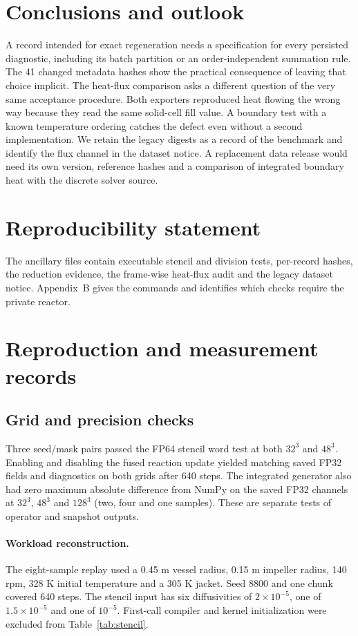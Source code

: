\documentclass{article}
\begin{document}
\section{Conclusions and outlook}
A record intended for exact regeneration needs a specification for every persisted diagnostic, including its batch partition or an order-independent summation rule. The 41 changed metadata hashes show the practical consequence of leaving that choice implicit. The heat-flux comparison asks a different question of the very same acceptance procedure. Both exporters reproduced heat flowing the wrong way because they read the same solid-cell fill value. A boundary test with a known temperature ordering catches the defect even without a second implementation. We retain the legacy digests as a record of the benchmark and identify the flux channel in the dataset notice. A replacement data release would need its own version, reference hashes and a comparison of integrated boundary heat with the discrete solver source.

\section*{Reproducibility statement}
The ancillary files contain executable stencil and division tests, per-record hashes, the reduction evidence, the frame-wise heat-flux audit and the legacy dataset notice. Appendix~B gives the commands and identifies which checks require the private reactor.



\clearpage
\appendix
\section{Reproduction and measurement records}
\subsection{Grid and precision checks}
Three seed/mask pairs passed the FP64 stencil word test at both $32^3$ and $48^3$. Enabling and disabling the fused reaction update yielded matching saved FP32 fields and diagnostics on both grids after 640 steps. The integrated generator also had zero maximum absolute difference from NumPy on the saved FP32 channels at $32^3$, $48^3$ and $128^3$ (two, four and one samples). These are separate tests of operator and snapshot outputs.

\paragraph{Workload reconstruction.}
The eight-sample replay used a 0.45 m vessel radius, 0.15 m impeller radius, 140 rpm, 328 K initial temperature and a 305 K jacket. Seed 8800 and one chunk covered 640 steps. The stencil input has six diffusivities of $2\times10^{-5}$, one of $1.5\times10^{-5}$ and one of $10^{-5}$. First-call compiler and kernel initialization were excluded from Table~\ref{tab:stencil}.
\end{document}
